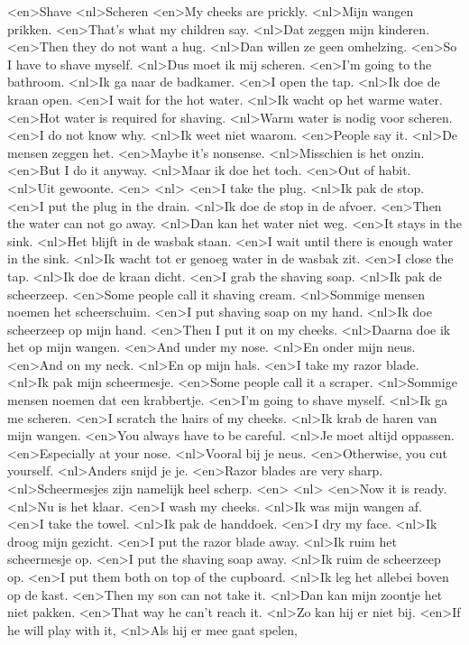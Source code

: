 <en>Shave
<nl>Scheren
<en>My cheeks are prickly.
<nl>Mijn wangen prikken.
<en>That's what my children say.
<nl>Dat zeggen mijn kinderen.
<en>Then they do not want a hug.
<nl>Dan willen ze geen omhelzing.
<en>So I have to shave myself.
<nl>Dus moet ik mij scheren.
<en>I'm going to the bathroom.
<nl>Ik ga naar de badkamer.
<en>I open the tap.
<nl>Ik doe de kraan open.
<en>I wait for the hot water.
<nl>Ik wacht op het warme water.
<en>Hot water is required for shaving.
<nl>Warm water is nodig voor scheren.
<en>I do not know why.
<nl>Ik weet niet waarom.
<en>People say it.
<nl>De mensen zeggen het.
<en>Maybe it's nonsense.
<nl>Misschien is het onzin.
<en>But I do it anyway.
<nl>Maar ik doe het toch.
<en>Out of habit.
<nl>Uit gewoonte.
<en>
<nl>
<en>I take the plug.
<nl>Ik pak de stop.
<en>I put the plug in the drain.
<nl>Ik doe de stop in de afvoer.
<en>Then the water can not go away.
<nl>Dan kan het water niet weg.
<en>It stays in the sink.
<nl>Het blijft in de wasbak staan.
<en>I wait until there is enough water in the sink.
<nl>Ik wacht tot er genoeg water in de wasbak zit.
<en>I close the tap.
<nl>Ik doe de kraan dicht.
<en>I grab the shaving soap.
<nl>Ik pak de scheerzeep.
<en>Some people call it shaving cream.
<nl>Sommige mensen noemen het  scheerschuim.
<en>I put shaving soap on my hand.
<nl>Ik doe scheerzeep op mijn hand.
<en>Then I put it on my cheeks.
<nl>Daarna doe ik het op mijn wangen.
<en>And under my nose.
<nl>En onder mijn neus.
<en>And on my neck.
<nl>En op mijn hals.
<en>I take my razor blade.
<nl>Ik pak mijn scheermesje.
<en>Some people call it a scraper.
<nl>Sommige mensen noemen dat een krabbertje.
<en>I'm going to shave myself.
<nl>Ik ga me scheren.
<en>I scratch the hairs of my cheeks.
<nl>Ik krab de haren van mijn wangen.
<en>You always have to be careful.
<nl>Je moet altijd oppassen.
<en>Especially at your nose.
<nl>Vooral bij je neus.
<en>Otherwise, you cut yourself.
<nl>Anders snijd je je.
<en>Razor blades are very sharp.
<nl>Scheermesjes zijn namelijk heel scherp.
<en>
<nl>
<en>Now it is ready.
<nl>Nu is het klaar.
<en>I wash my cheeks.
<nl>Ik was mijn wangen af.
<en>I take the towel.
<nl>Ik pak de handdoek.
<en>I dry my face.
<nl>Ik droog mijn gezicht.
<en>I put  the razor blade away.
<nl>Ik ruim het scheermesje op.
<en>I put the shaving soap away.
<nl>Ik ruim de scheerzeep op.
<en>I put them both on top of the cupboard.
<nl>Ik leg het allebei boven op de kast.
<en>Then my son can not take it.
<nl>Dan kan mijn zoontje het niet pakken.
<en>That way he can't reach it.
<nl>Zo kan hij er niet bij.
<en>If he will play with it,
<nl>Als hij er mee gaat spelen,
